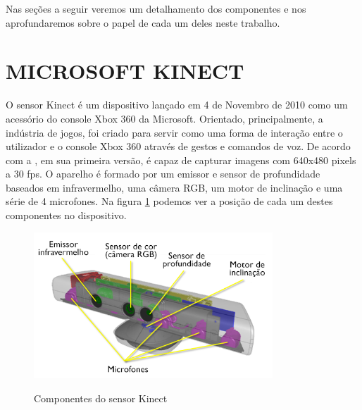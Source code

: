 Nas seções a seguir veremos um detalhamento dos componentes e nos aprofundaremos sobre o papel de cada um deles neste trabalho. 

\section{MICROSOFT KINECT}

O sensor Kinect é um dispositivo lançado em 4 de Novembro de 2010 como um acessório do console Xbox 360 da Microsoft. Orientado, principalmente, a indústria de jogos, foi criado para servir como uma forma de interação entre o utilizador e o console Xbox 360 através de gestos e comandos de voz. De acordo com a , em sua primeira versão, é capaz de capturar imagens com 640x480 pixels a 30 fps. O aparelho é formado por um emissor e sensor de profundidade baseados em infravermelho, uma câmera RGB, um motor de inclinação e uma série de 4 microfones. Na figura \ref{fig:kinect_componentes} podemos ver a posição de cada um destes componentes no dispositivo.

\begin{figure}[H]
    \centering
    \caption{Componentes do sensor Kinect}
	\vspace*{0,2cm}
    \includegraphics[width=0.8\textwidth]{./04-figuras/kinect_componentes}
    \label{fig:kinect_componentes}
\end{figure}
\vspace*{-0,9cm}
{\raggedright {}}\\

